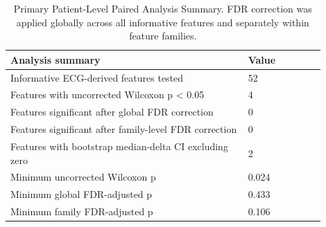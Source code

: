 \begin{table}
\caption{Primary Patient-Level Paired Analysis Summary. FDR correction was applied globally across all informative features and separately within feature families.}
\label{tab:primary_paired_overall_summary}
\begin{tabular}{p{0.68\linewidth}p{0.22\linewidth}}
\toprule
Analysis summary & Value \\
\midrule
Informative ECG-derived features tested & 52 \\
Features with uncorrected Wilcoxon p < 0.05 & 4 \\
Features significant after global FDR correction & 0 \\
Features significant after family-level FDR correction & 0 \\
Features with bootstrap median-delta CI excluding zero & 2 \\
Minimum uncorrected Wilcoxon p & 0.024 \\
Minimum global FDR-adjusted p & 0.433 \\
Minimum family FDR-adjusted p & 0.106 \\
\bottomrule
\end{tabular}
\end{table}
